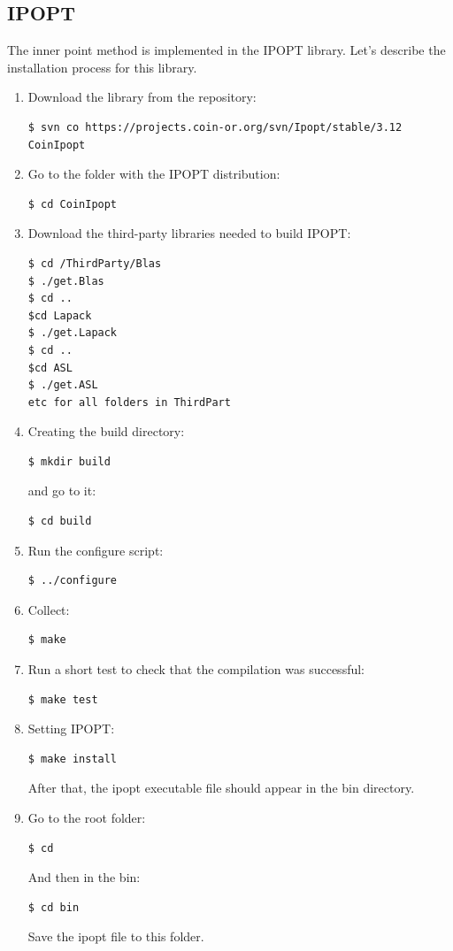 \documentclass[11pt,fleqn,a4paper]{scrartcl}
\begin{document}
\subsection{IPOPT}
The inner point method is implemented in the IPOPT library. Let's describe the installation process for this library.
\begin{enumerate}
\item Download the library from the repository:
\begin{verbatim}
$ svn co https://projects.coin-or.org/svn/Ipopt/stable/3.12 CoinIpopt
\end{verbatim}
\item Go to the folder with the IPOPT distribution:
\begin{verbatim}
$ cd CoinIpopt
\end{verbatim}
\item Download the third-party libraries needed to build IPOPT:
\begin{verbatim}
$ cd /ThirdParty/Blas
$ ./get.Blas 
$ cd ..
$cd Lapack 
$ ./get.Lapack 
$ cd ..
$cd ASL 
$ ./get.ASL
etc for all folders in ThirdPart
\end{verbatim}
\item Creating the build directory:
\begin{verbatim}
$ mkdir build
\end{verbatim}
and go to it:
\begin{verbatim}
$ cd build
\end{verbatim}
\item Run the configure script:
\begin{verbatim}
$ ../configure
\end{verbatim}
\item Collect:
\begin{verbatim}
$ make
\end{verbatim}
\item Run a short test to check that the compilation was successful:
\begin{verbatim}
$ make test
\end{verbatim}
\item Setting IPOPT:
\begin{verbatim}
$ make install
\end{verbatim}
After that, the ipopt executable file should appear in the bin directory.
\item Go to the root folder:
\begin{verbatim}
$ cd
\end{verbatim}
And then in the bin:
\begin{verbatim}
$ cd bin
\end{verbatim}
Save the ipopt file to this folder.
\end{enumerate}
\end{document}
